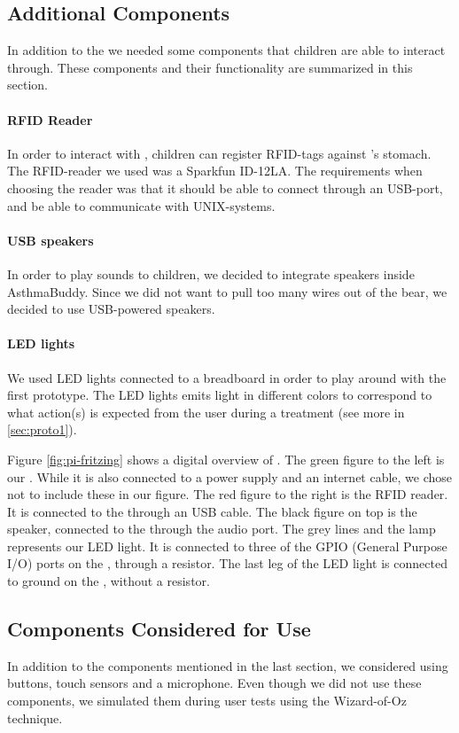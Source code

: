   
\subsection{Additional Components}
In addition to the \rpi{} we needed some components that children are able to interact through. These components and their functionality are summarized in this section. 


\paragraph{RFID Reader}
In order to interact with \ab{}, children can register RFID-tags against \ab{}'s stomach. The RFID-reader we used was a Sparkfun ID-12LA. The requirements when choosing the reader was that it should be able to connect through an USB-port, and be able to communicate with UNIX-systems.
         
\paragraph{USB speakers}
In order to play sounds to children, we decided to integrate speakers inside AsthmaBuddy. Since we did not want to pull too many wires out of the bear, we decided to use USB-powered speakers.    

\paragraph{LED lights}
We used LED lights connected to a breadboard in order to play around with the first prototype. The LED lights emits light in different colors to correspond to what action(s) is expected from the user during a treatment (see more in \ref{sec:proto1}).
 

Figure \ref{fig:pi-fritzing} shows a digital overview of \buddy{}. The green figure to the left is our \rpi{}. While it is also connected to a power supply and an internet cable, we chose not to include these in our figure. The red figure to the right is the RFID reader. It is connected to the \rpi{} through an USB cable. The black figure on top is the speaker, connected to the \rpi{} through the audio port. 
The grey lines and the lamp represents our LED light. It is connected to three of the GPIO (General Purpose I/O) ports on the \rpi{}, through a resistor. The last leg of the LED light is connected to ground on the \rpi{}, without a resistor.

\subsection{Components Considered for Use}
In addition to the components mentioned in the last section, we considered using buttons, touch sensors and a microphone. Even though we did not use these components, we simulated them during user tests using the Wizard-of-Oz technique. 

